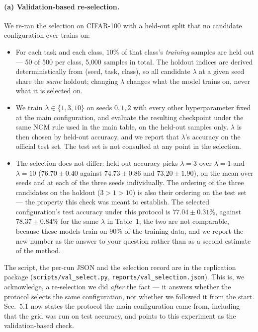 \paragraph{(a) Validation-based re-selection.} We re-ran the selection on CIFAR-100 with a
held-out split that no candidate configuration ever trains on:
\begin{itemize}
\item For each task and each class, $10\%$ of that class's \emph{training} samples are held
  out --- 50 of 500 per class, 5{,}000 samples in total. The holdout indices are derived
  deterministically from (seed, task, class), so all candidate $\lambda$ at a given seed
  share the \emph{same} holdout; changing $\lambda$ changes what the model trains on, never
  what it is selected on.
\item We train $\lambda\in\{1,3,10\}$ on seeds $0,1,2$ with every other hyperparameter fixed
  at the main configuration, and evaluate the resulting checkpoint under the same NCM rule
  used in the main table, on the held-out samples only. $\lambda$ is then chosen by held-out
  accuracy, and we report that $\lambda$'s accuracy on the official test set. The test set is
  not consulted at any point in the selection.
\item The selection does not differ: held-out accuracy picks $\lambda{=}3$ over
  $\lambda{=}1$ and $\lambda{=}10$ ($76.70\pm0.40$ against $74.73\pm0.86$ and
  $73.20\pm1.90$), on the mean over seeds and at each of the three seeds individually. The
  ordering of the three candidates on the holdout ($3>1>10$) is also their ordering on the
  test set --- the property this check was meant to establish. The selected configuration's
  test accuracy under this protocol is $77.04\pm0.31\%$, against $78.37\pm0.84\%$ for the same
  $\lambda$ in Table~1; the two are not comparable, because these models train on $90\%$ of
  the training data, and we report the new number as the answer to your question rather than
  as a second estimate of the method.
\end{itemize}
The script, the per-run JSON and the selection record are in the replication package
(\texttt{scripts/val\_select.py}, \texttt{reports/val\_selection.json}). This is, we
acknowledge, a re-selection we did \emph{after} the fact --- it answers whether the protocol
selects the same configuration, not whether we followed it from the start. Sec.~5.1
now states the protocol the main configuration came from, including that the grid was run on
test accuracy, and points to this experiment as the validation-based check.

